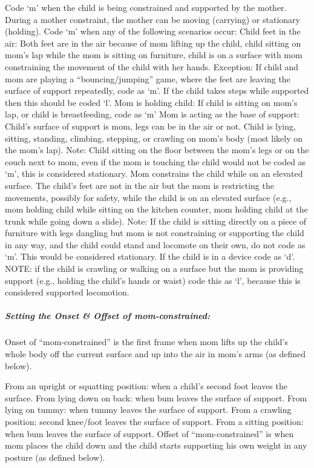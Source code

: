 \documentclass[
  12pt,
]{book}
\begin{document}
Code `m' when the child is being constrained and supported by the mother. During a mother constraint, the mother can be moving (carrying) or stationary (holding). Code `m' when any of the following scenarios occur:
Child feet in the air: Both feet are in the air because of mom lifting up the child, child sitting on mom's lap while the mom is sitting on furniture, child is on a surface with mom constraining the movement of the child with her hands. Exception: If child and mom are playing a ``bouncing/jumping'' game, where the feet are leaving the surface of support repeatedly, code as `m'. If the child takes steps while supported then this should be coded `l'.
Mom is holding child: If child is sitting on mom's lap, or child is breastfeeding, code as `m'
Mom is acting as the base of support: Child's surface of support is mom, legs can be in the air or not. Child is lying, sitting, standing, climbing, stepping, or crawling on mom's body (most likely on the mom's lap).
Note: Child sitting on the floor between the mom's legs or on the couch next to mom, even if the mom is touching the child would not be coded as `m', this is considered stationary.
Mom constrains the child while on an elevated surface. The child's feet are not in the air but the mom is restricting the movements, possibly for safety, while the child is on an elevated surface (e.g., mom holding child while sitting on the kitchen counter, mom holding child at the trunk while going down a slide). Note: If the child is sitting directly on a piece of furniture with legs dangling but mom is not constraining or supporting the child in any way, and the child could stand and locomote on their own, do not code as `m'. This would be considered stationary. If the child is in a device code as `d'.
NOTE: if the child is crawling or walking on a surface but the mom is providing support (e.g., holding the child's hands or waist) code this as `l', because this is considered supported locomotion.

\hypertarget{setting-the-onset-offset-of-mom-constrained}{%
\subparagraph*{Setting the Onset \& Offset of mom-constrained:}\label{setting-the-onset-offset-of-mom-constrained}}

Onset of ``mom-constrained'' is the first frame when mom lifts up the child's whole body off the current surface and up into the air in mom's arms (as defined below).

From an upright or squatting position: when a child's second foot leaves the surface.
From lying down on back: when bum leaves the surface of support.
From lying on tummy: when tummy leaves the surface of support.
From a crawling position: second knee/foot leaves the surface of support.
From a sitting position: when bum leaves the surface of support.
Offset of ``mom-constrained'' is when mom places the child down and the child starts supporting his own weight in any posture (as defined below).
\end{document}
